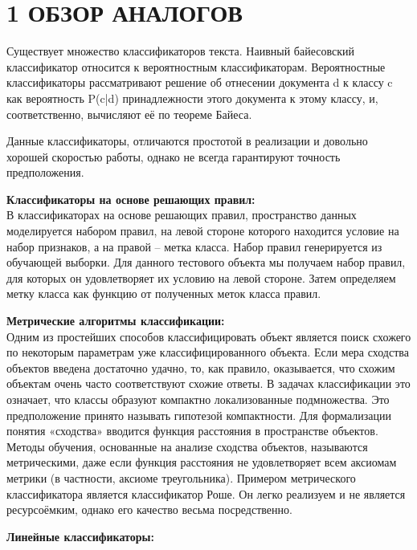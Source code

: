 \documentclass[14pt,a4paper]{extreport}
\begin{document}
	\section*{\normalsize\hspace{4ex} 1 ОБЗОР АНАЛОГОВ}
    \par Существует множество классификаторов текста. Наивный байесовский классификатор относится к вероятностным классификаторам. Вероятностные классификаторы рассматривают решение об отнесении документа d к классу c как вероятность P(c|d) принадлежности этого документа к этому классу, и, соответственно, вычисляют её по теореме Байеса.
    \\ \par Данные классификаторы, отличаются простотой в реализации и довольно хорошей скоростью работы, однако не всегда гарантируют точность предположения.
    \\ \par \textbf{Классификаторы на основе решающих правил:}\\
В классификаторах на основе решающих правил, пространство данных моделируется набором правил, на левой стороне которого находится условие на набор признаков, а на правой – метка класса. Набор правил генерируется из обучающей выборки. Для данного тестового объекта мы получаем набор правил, для которых он удовлетворяет их условию на левой стороне. Затем определяем метку класса как функцию от полученных меток класса правил.
    \\ \par \textbf{Метрические алгоритмы классификации:}\\
Одним из простейших способов классифицировать объект является поиск схожего по некоторым параметрам уже классифицированного объекта. Если мера сходства объектов введена достаточно удачно, то, как правило, оказывается, что схожим объектам очень часто соответствуют схожие ответы. В задачах классификации это означает, что классы образуют компактно локализованные подмножества. Это предположение принято называть гипотезой компактности. Для формализации понятия «сходства» вводится функция расстояния в пространстве объектов. Методы обучения, основанные на анализе сходства объектов, называются метрическими, даже если функция расстояния не удовлетворяет всем аксиомам метрики (в частности, аксиоме треугольника).
Примером  метрического классификатора является классификатор Роше. Он легко реализуем и не является ресурсоёмким, однако его качество весьма посредственно.
    \\ \par \textbf{Линейные классификаторы:}\\
\end{document}
